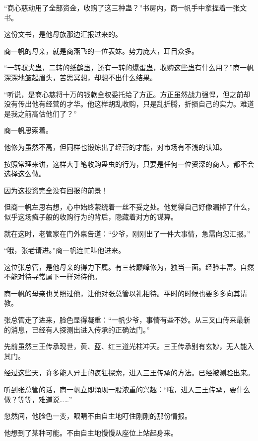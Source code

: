 
\begin{this_body}

“商心慈动用了全部资金，收购了这三种蛊？”书房内，商一帆手中拿捏着一张文书。

这份文书，是他母族那边汇报过来的。

商一帆的母亲，就是商燕飞的一位表妹。势力庞大，耳目众多。

“一转驭犬蛊，二转的纸鹤蛊，还有一转的爆蛋蛊，收购这些蛊有什么用？”商一帆深深地皱起眉头，苦思冥想，却想不出什么结果。

“听说，是商心慈将十万的钱款全权委托给了方正。方正虽然战力强悍，但之前却没有传出他有经营的才华。他这样胡乱收购，只是乱折腾，折损自己的实力。难道是我之前高估他们了？”

商一帆思索着。

他修为虽然不高，但同样也锻炼出了经营的才能，对市场有不浅的认知。

按照常理来讲，这样大手笔收购蛊虫的行为，只要是任何一位资深的商人，都不会选择这么做。

因为这投资完全没有回报的前景！

但商一帆左思右想，心中始终萦绕着一丝不妥之处。他觉得自己好像漏掉了什么，似乎这场疯子般的收购行为的背后，隐藏着对方的谋算。

就在这时，老管家在门外禀告道：“少爷，刚刚出了一件大事情，急需向您汇报。”

“哦，张老请进。”商一帆连忙叫他进来。

这位张总管，是他母亲的得力下属。有三转巅峰修为，独当一面。经验丰富。自然不能对待寻常属下一样对待他。

商一帆的母亲也关照过他，让他对张总管以礼相待。平时的时候也要多多向其请教。

张总管走了进来，脸色显得凝重：“一帆少爷，事情有些不妙。从三叉山传来最新的消息，已经有人探测出进入传承的正确法门。”

先前虽然三王传承现世，黄、蓝、红三道光柱冲天。三王传承别有玄妙，无人能入其门。

经过这些天，许多能人异士的疯狂探索，进入三王传承的方法。已经被测验出来。

听到张总管的话，商一帆立即涌现一股浓重的兴趣：“哦，进入三王传承，要什么做？等等，难道说……”

忽然间，他脸色一变，眼睛不由自主地盯住刚刚的那份情报。

他想到了某种可能。不由自主地慢慢从座位上站起身来。


\end{this_body}
